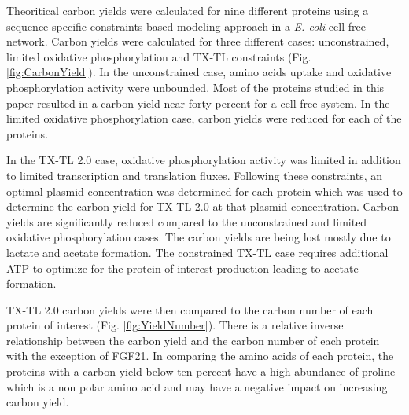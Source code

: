 \documentclass[12pt]{article}
\begin{document}

Theoritical carbon yields were calculated for nine different proteins using a sequence specific constraints based modeling approach in a \textit{E. coli} cell free network. 
Carbon yields were calculated for three different cases: unconstrained, limited oxidative phosphorylation and TX-TL constraints (Fig. \ref{fig:CarbonYield}). 
In the unconstrained case, amino acids uptake and oxidative phosphorylation activity were unbounded. 
Most of the proteins studied in this paper resulted in a carbon yield near forty percent for a cell free system.
In the limited oxidative phosphorylation case, carbon yields were reduced for each of the proteins. 
   
In the TX-TL 2.0 case, oxidative phosphorylation activity was limited in addition to limited transcription and translation fluxes.
Following these constraints, an optimal plasmid concentration was determined for each protein which was used to determine the carbon yield for TX-TL 2.0 at that plasmid concentration.
Carbon yields are significantly reduced compared to the unconstrained and limited oxidative phosphorylation cases.
The carbon yields are being lost mostly due to lactate and acetate formation.
The constrained TX-TL case requires additional ATP to optimize for the protein of interest production leading to acetate formation.

TX-TL 2.0 carbon yields were then compared to the carbon number of each protein of interest (Fig. \ref{fig:YieldNumber}). 
There is a relative inverse relationship between the carbon yield and the carbon number of each protein with the exception of FGF21. 
In comparing the amino acids of each protein, the proteins with a carbon yield below ten percent have a high abundance of proline which is a non polar amino acid and may have a negative impact on increasing carbon yield. 
\end{document}

